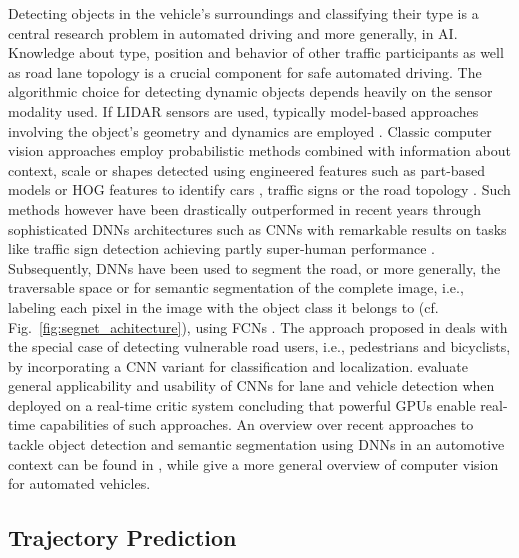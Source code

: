Detecting objects in the vehicle's surroundings and classifying their type is a central research problem in automated driving and more generally, in \ac{AI}.
Knowledge about type, position and behavior of other traffic participants as well as road lane topology is a crucial component for safe automated driving.
The algorithmic choice for detecting dynamic objects depends heavily on the sensor modality used.
If \ac{LIDAR} sensors are used, typically model-based approaches involving the object's geometry and dynamics are employed \parencite{Petrovskaya2009a, Petrovskaya2009, Darms2008}.
Classic computer vision approaches employ probabilistic methods combined with information about context, scale or shapes detected using engineered features such as part-based models or \ac{HOG} features to identify cars \parencite{Held2012}, traffic signs \parencite{Li2015} or the road topology \parencite{Alvarez2011, Beyeler2014}.
Such methods however have been drastically outperformed in recent years through sophisticated \acp{DNN} architectures such as \acp{CNN} with remarkable results on tasks like traffic sign detection \parencite{Ciresan2012, Sermanet2011} achieving partly super-human performance \parencite{Stallkamp2012}.
Subsequently, \acp{DNN} have been used to segment the road, or more generally, the traversable space \parencite{Mohan2014, Bittel2015} or for semantic segmentation of the complete image, i.e., labeling each pixel in the image with the object class it belongs to (cf. Fig.~\ref{fig:segnet_achitecture}), using \acp{FCN} \parencite{Badrinarayanan2015, Long2015, Chen2018}.
The approach proposed in \textcite{Li2017} deals with the special case of detecting vulnerable road users, i.e., pedestrians and bicyclists, by incorporating a \ac{CNN} variant for classification and localization.
\textcite{Huval2015} evaluate general applicability and usability of \acp{CNN} for lane and vehicle detection when deployed on a real-time critic system concluding that powerful \acp{GPU} enable real-time capabilities of such approaches.
An overview over recent approaches to tackle object detection and semantic segmentation using \acp{DNN} in an automotive context can be found in \textcite{Feng2019}, while \textcite{Janai2017} give a more general overview of computer vision for automated vehicles.

\subsection{Trajectory Prediction}%
\label{subsec:trajectory_prediction}

